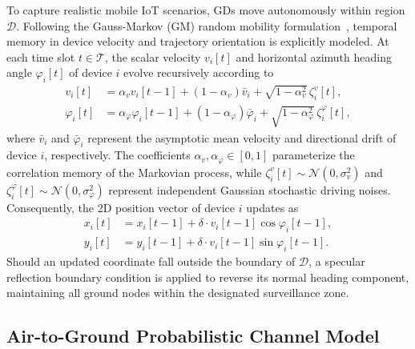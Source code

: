 \documentclass[journal]{IEEEtran}
\begin{document}
To capture realistic mobile IoT scenarios, GDs move autonomously within region $\mathcal{D}$. Following the Gauss-Markov (GM) random mobility formulation~\cite{11395508, li2026tnse}, temporal memory in device velocity and trajectory orientation is explicitly modeled. At each time slot $t \in \mathcal{T}$, the scalar velocity $v_i[t]$ and horizontal azimuth heading angle $\varphi_i[t]$ of device $i$ evolve recursively according to
\begin{align}
    v_i[t] &= \alpha_v v_i[t-1] + (1 - \alpha_v)\bar{v}_i + \sqrt{1 - \alpha_v^2}\,\zeta_i^v[t], \label{eq:gm_speed}\\
    \varphi_i[t] &= \alpha_\varphi \varphi_i[t-1] + (1 - \alpha_\varphi)\bar{\varphi}_i + \sqrt{1 - \alpha_\varphi^2}\,\zeta_i^\varphi[t], \label{eq:gm_direction}
\end{align}
where $\bar{v}_i$ and $\bar{\varphi}_i$ represent the asymptotic mean velocity and directional drift of device $i$, respectively. The coefficients $\alpha_v, \alpha_\varphi \in [0, 1]$ parameterize the correlation memory of the Markovian process, while $\zeta_i^v[t] \sim \mathcal{N}(0, \sigma_v^2)$ and $\zeta_i^\varphi[t] \sim \mathcal{N}(0, \sigma_\varphi^2)$ represent independent Gaussian stochastic driving noises. Consequently, the 2D position vector of device $i$ updates as
\begin{align}
    x_i[t] &= x_i[t-1] + \delta \cdot v_i[t-1] \cos\varphi_i[t-1], \label{eq:pos_x}\\
    y_i[t] &= y_i[t-1] + \delta \cdot v_i[t-1] \sin\varphi_i[t-1]. \label{eq:pos_y}
\end{align}
Should an updated coordinate fall outside the boundary of $\mathcal{D}$, a specular reflection boundary condition is applied to reverse its normal heading component, maintaining all ground nodes within the designated surveillance zone.

\subsection{Air-to-Ground Probabilistic Channel Model}
\end{document}
